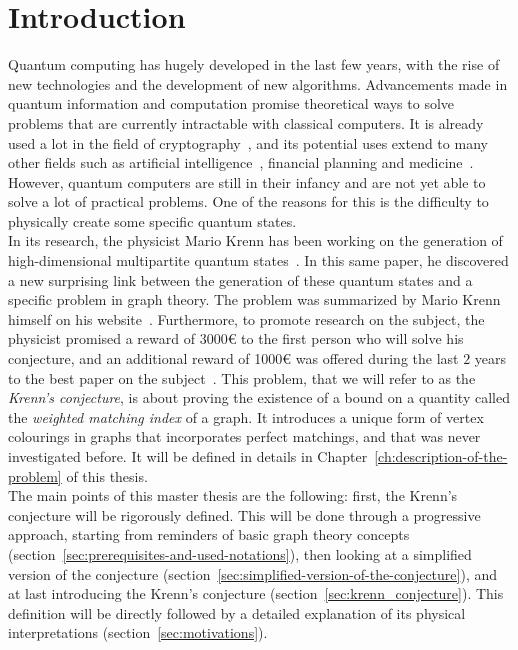 \setcounter{secnumdepth}{-1}

\chapter{Introduction}
\label{ch:introduction}

Quantum computing has hugely developed in the last few years, with the rise of new technologies and the development of new algorithms.
Advancements made in quantum information and computation promise theoretical ways to solve problems that are currently intractable with classical computers.
It is already used a lot in the field of cryptography~\cite{kumar2021state}, and its potential uses extend to many other fields such as artificial intelligence~\cite{otterbach2017unsupervised}, financial planning and medicine~\cite{hassija2020forthcoming}.
However, quantum computers are still in their infancy and are not yet able to solve a lot of practical problems.
One of the reasons for this is the difficulty to physically create some specific quantum states.\\

In its research, the physicist Mario Krenn has been working on the generation of high-dimensional multipartite quantum states~\cite{Krenn_2017}.
In this same paper, he discovered a new surprising link between the generation of these quantum states and a specific problem in graph theory.
The problem was summarized by Mario Krenn himself on his website~\cite{wordpress}.
Furthermore, to promote research on the subject, the physicist promised a reward of 3000€ to the first person who will solve his conjecture, and an additional reward of 1000€ was offered during the last $2$ years to the best paper on the subject~\cite{wordpress}.
This problem, that we will refer to as the \textit{Krenn's conjecture}, is about proving the existence of a bound on a quantity called the \textit{weighted matching index} of a graph.
It introduces a unique form of vertex colourings in graphs that incorporates perfect matchings, and that was never investigated before.
It will be defined in details in Chapter~\ref{ch:description-of-the-problem} of this thesis.\\

The main points of this master thesis are the following: first, the Krenn's conjecture will be rigorously defined.
This will be done through a progressive approach, starting from reminders of basic graph theory concepts (section~\ref{sec:prerequisites-and-used-notations}), then looking at a simplified version of the conjecture (section~\ref{sec:simplified-version-of-the-conjecture}), and at last introducing the Krenn's conjecture (section~\ref{sec:krenn_conjecture}).
This definition will be directly followed by a detailed explanation of its physical interpretations (section~\ref{sec:motivations}).\\


